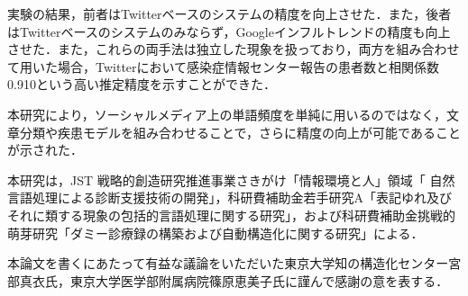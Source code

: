 \documentclass[japanese]{jnlp_1.4}
\begin{document}
実験の結果，前者はTwitterベースのシステムの精度を向上させた．また，後者はTwitterベースのシステムのみならず，Googleインフルトレンドの精度も向上させた．また，これらの両手法は独立した現象を扱っており，両方を組み合わせて用いた場合，Twitterにおいて感染症情報センター報告の患者数と相関係数0.910という高い推定精度を示すことができた．

本研究により，ソーシャルメディア上の単語頻度を単純に用いるのではなく，文章分類や疾患モデルを組み合わせることで，さらに精度の向上が可能であることが示された．


\acknowledgment

本研究は，JST 戦略的創造研究推進事業さきがけ「情報環境と人」領域「 自然言語処理による診断支援技術の開発」，科研費補助金若手研究A「表記ゆれ及びそれに類する現象の包括的言語処理に関する研究」，および科研費補助金挑戦的萌芽研究「ダミー診療録の構築および自動構造化に関する研究」による．

本論文を書くにあたって有益な議論をいただいた東京大学知の構造化センター宮部真衣氏，東京大学医学部附属病院篠原恵美子氏に謹んで感謝の意を表する．
\end{document}
